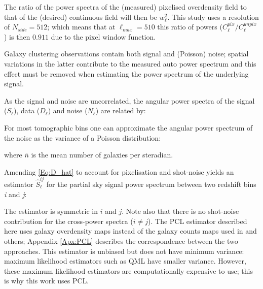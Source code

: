 
\noindent The ratio of the power spectra of the (measured) pixelised overdensity field to that of the (desired) continuous field will then be $w_{\ell}^2$. This study uses a \healpix resolution of $N_{side} = 512$; which means that at $\ell_{max} = 510$ this ratio of powers ($C_{\ell}^{pix}/C_{\ell}^{unpix}$) is then $0.911$ due to the pixel window function.

\qquad Galaxy clustering observations contain both signal and (Poisson) noise; spatial variations in the latter contribute to the measured auto power spectrum and this effect must be removed when estimating the power spectrum of the underlying signal. 

\qquad As the signal and noise are uncorrelated, the angular power spectra of the signal ($S_{\ell}$), data ($D_{\ell}$) and noise ($N_{\ell}$) are related by:


\qquad For most tomographic bins one can approximate the angular power spectrum of the noise as the variance of a Poisson distribution:


\noindent where $\bar{n}$ is the mean number of galaxies per steradian.

\qquad Amending \eqref{Eq:D_hat} to account for pixelisation and shot-noise yields an estimator $\hat{S}^{ij}_{\ell}$ for the partial sky signal power spectrum between two redshift bins \textit{i} and \textit{j}:



\noindent The estimator is symmetric in $i$ and $j$. Note also that there is no shot-noise contribution for the cross-power spectra ($i \neq j$). The PCL estimator described here uses galaxy overdensity maps instead of the galaxy counts maps used in \cite{Blake2007,Thomas2011} and others; Appendix \ref{Apx:PCL} describes the correspondence between the two approaches. This estimator is unbiased \citep{Peebles1973} but does not have minimum variance: maximum likelihood estimators such as QML \citep[e.g.][]{Efstat2004} have smaller variance. However, these maximum likelihood estimators are computationally expensive to use; this is why this work uses PCL. %

